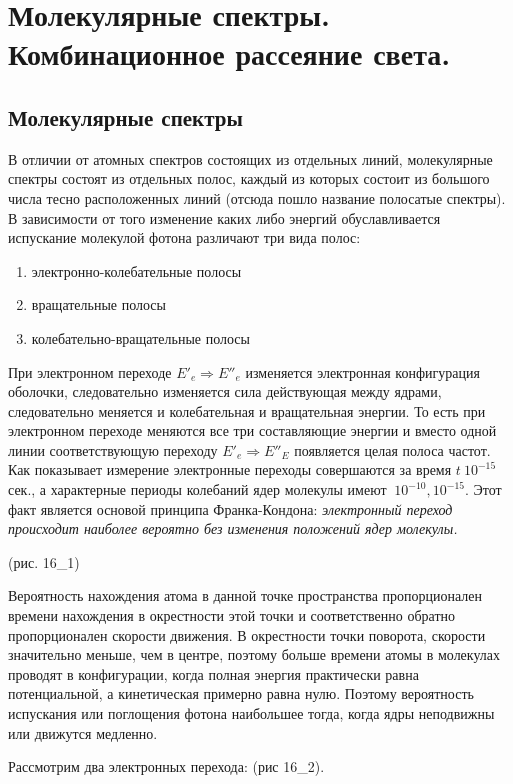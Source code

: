 \chapter{Молекулярные спектры. Комбинационное рассеяние света.}

\section{Молекулярные спектры}
В отличии от атомных спектров состоящих из отдельных линий, молекулярные 
спектры состоят из отдельных полос, каждый из которых состоит из большого 
числа тесно расположенных линий (отсюда пошло название полосатые спектры). 
В зависимости от того изменение каких либо энергий обуславливается 
испускание молекулой фотона различают три вида полос:
\begin{enumerate}
    \item электронно-колебательные полосы
    \item вращательные полосы
    \item колебательно-вращательные полосы
\end{enumerate}

При электронном переходе \( E'_e \Rightarrow E''_e \) изменяется 
электронная конфигурация оболочки, следовательно изменяется сила 
действующая между ядрами, следовательно меняется и колебательная и 
вращательная энергии. То есть при электронном переходе меняются все три 
составляющие энергии и вместо одной линии соответствующую переходу 
\( E'_e \Rightarrow E''_E \) появляется целая полоса частот. Как 
показывает измерение электронные переходы совершаются за время 
\( t ~ 10^{-15} \) сек., а характерные периоды колебаний ядер молекулы 
имеют \( ~ 10^{-10}, 10^{-15} \). Этот факт является основой принципа 
Франка-Кондона: \emph{электронный переход происходит наиболее вероятно без 
изменения положений ядер молекулы.} 

(рис. 16_1)

Вероятность нахождения атома в данной точке пространства пропорционален 
времени нахождения в окрестности этой точки и соответственно обратно 
пропорционален скорости движения. В окрестности точки поворота, скорости 
значительно меньше, чем в центре, поэтому больше времени атомы в молекулах 
проводят в конфигурации, когда полная энергия практически равна 
потенциальной, а кинетическая примерно равна нулю. Поэтому вероятность 
испускания или поглощения фотона наибольшее тогда, когда ядры неподвижны 
или движутся медленно.

Рассмотрим два электронных перехода: (рис 16_2).

